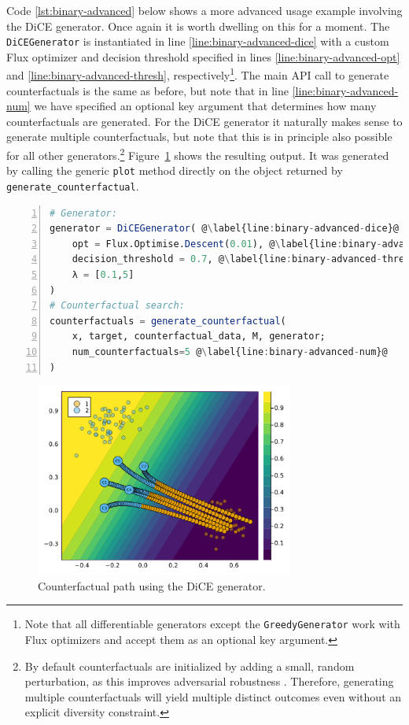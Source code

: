 \documentclass[
  letterpaper,
  DIV=11,
  numbers=noendperiod]{scrartcl}
\begin{document}
Code \ref{lst:binary-advanced} below shows a more advanced usage example
involving the DiCE generator. Once again it is worth dwelling on this
for a moment. The \texttt{DiCEGenerator} is instantiated in line
\ref{line:binary-advanced-dice} with a custom Flux optimizer and
decision threshold specified in lines \ref{line:binary-advanced-opt} and
\ref{line:binary-advanced-thresh}, respectively\footnote{Note that all
  differentiable generators except the \texttt{GreedyGenerator} work
  with Flux optimizers and accept them as an optional key argument.}.
The main API call to generate counterfactuals is the same as before, but
note that in line \ref{line:binary-advanced-num} we have specified an
optional key argument that determines how many counterfactuals are
generated. For the DiCE generator it naturally makes sense to generate
multiple counterfactuals, but note that this is in principle also
possible for all other generators.\footnote{By default counterfactuals
  are initialized by adding a small, random perturbation, as this
  improves adversarial robustness \cite{slack2021counterfactual}.
  Therefore, generating multiple counterfactuals will yield multiple
  distinct outcomes even without an explicit diversity constraint.}
Figure~\ref{fig-binary-advanced} shows the resulting output. It was
generated by calling the generic \texttt{plot} method directly on the
object returned by \texttt{generate\_counterfactual}.

\begin{lstlisting}[language=Julia, escapechar=@, numbers=left, label={lst:binary-advanced}, caption={Using the DiCE generator.}]
# Generator:
generator = DiCEGenerator( @\label{line:binary-advanced-dice}@
    opt = Flux.Optimise.Descent(0.01), @\label{line:binary-advanced-opt}@
    decision_threshold = 0.7, @\label{line:binary-advanced-thresh}@
    λ = [0.1,5]
)
# Counterfactual search:
counterfactuals = generate_counterfactual(
    x, target, counterfactual_data, M, generator;
    num_counterfactuals=5 @\label{line:binary-advanced-num}@
)
\end{lstlisting}

\begin{figure}

{\centering \includegraphics[width=3.33333in,height=2.5in]{www/binary_advanced.png}

}

\caption{\label{fig-binary-advanced}Counterfactual path using the DiCE
generator.}

\end{figure}
\end{document}
